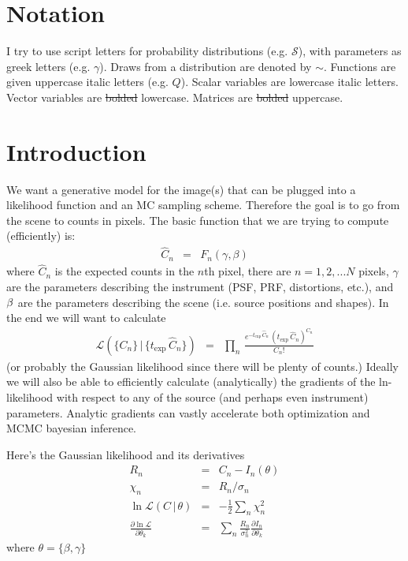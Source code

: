 \documentclass[modern]{aastex62}
\newcommand{\given}{\,|\,}
\newcommand{\counts}{C}
\newcommand{\countrate}{\hat{C}}
\newcommand{\exptime}{t_{\mathrm{exp}}}
\newcommand{\qe}{Q}
\newcommand{\scene}{\mathcal{S}}
\newcommand{\like}{\mathcal{L}}
\begin{document}
\author{Image Forward Modeling Techniques}


\section{Notation}
I try to use script letters for probability distributions (e.g. $\scene$), with parameters as greek letters (e.g. $\gamma$).
Draws from a distribution are denoted by $\sim$.
Functions are given uppercase italic letters (e.g. $\qe$).
Scalar variables are lowercase italic letters.
Vector variables are \sout{bolded} lowercase.
Matrices are \sout{bolded} uppercase.

\section{Introduction}
We want a generative model for the image(s) that can be plugged into a
likelihood function and an MC sampling scheme. Therefore the goal is to go from
the scene to counts in pixels. The basic function that we are trying to compute
(efficiently) is:
\begin{eqnarray}
\countrate_n & = & F_n(\gamma, \beta)
\end{eqnarray}
where 
$\countrate_n$ is the expected counts in the $n$th pixel,
there are $n=1,2,...N$ pixels,
$\gamma$ are the parameters describing the instrument (PSF, PRF, distortions, etc.),
and ${\bf \beta}$ are the parameters describing the scene (i.e. source positions and shapes).
In the end we will want to calculate
\begin{eqnarray}
\like(\{\counts_n\} \given \{\exptime \, \countrate_n\}) & = & \prod_n \, \frac{e^{-\exptime \, \countrate_n} \, (\exptime \, \countrate_n)^{\counts_n}} {\counts_n !}
\end{eqnarray}
(or probably the Gaussian likelihood since there will be plenty of counts.)
Ideally we will also be able to efficiently calculate (analytically) the
gradients of the ln-likelihood with respect to any of the source (and perhaps
even instrument) parameters. Analytic gradients can vastly accelerate both
optimization and MCMC bayesian inference.

Here's the Gaussian likelihood and its derivatives
\begin{eqnarray}
R_n & = & C_n - I_n(\theta) \nonumber \\
\chi_n & = & R_n / \sigma_n \nonumber \\
\ln \like(C \given \theta) & = & -\frac{1}{2} \sum_n \chi_n^2 \nonumber \\
\frac{\partial \ln \like}{\partial \theta_k} & = & \sum_n \frac{R_n}{\sigma_n^2} \frac{\partial I_n}{\partial \theta_k} 
\end{eqnarray}
where $\theta = \{\beta, \gamma\}$
\end{document}
